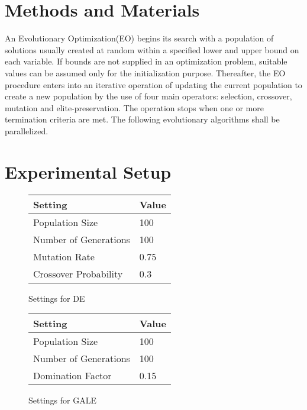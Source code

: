 \documentclass[conference]{IEEEtran}
\begin{document}
\section{Methods and Materials}
\label{algos}

An Evolutionary Optimization(EO) begins its search with a population of solutions usually created at random within a specified lower and upper bound on each variable. If bounds are not supplied in an optimization problem, suitable values can be assumed only for the initialization purpose. Thereafter, the EO procedure enters into an iterative operation of updating the current population to create a new population by the use of four main operators: selection, crossover, mutation and elite-preservation. The operation stops when one or more termination criteria are met. The following evolutionary algorithms shall be parallelized.

\section{Experimental Setup}

\begin{figure}
\centering
\begin{tabular}{|l@{~}|l@{~}|}
\hline
Setting & Value \\ \hline
Population Size               & 100   \\
Number of Generations         & 100   \\
Mutation Rate                 & 0.75  \\ 
Crossover Probability         & 0.3  \\ \hline
\end{tabular}
\caption{Settings for DE}
\label{fig:de_settings}
\end{figure}

\begin{figure}
\centering
\begin{tabular}{|l@{~}|l@{~}|}
\hline
Setting & Value \\ \hline
Population Size               & 100   \\
Number of Generations         & 100   \\
Domination Factor             & 0.15  \\ \hline 
\end{tabular}
\caption{Settings for GALE}
\label{fig:gale_settings}
\end{figure}
\end{document}
